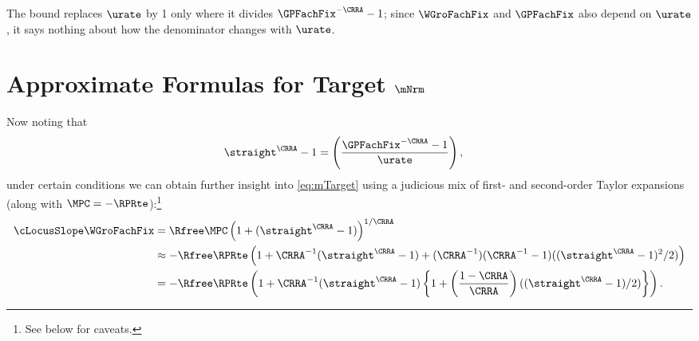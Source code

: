 \documentclass{econark}
\begin{document}
The bound replaces $\urate$ by 1 only where it divides $\GPFachFix^{-\CRRA}-1$; since $\WGroFachFix$ and $\GPFachFix$ also depend on $\urate$, it says nothing about how the denominator changes with $\urate$.


\section{Approximate Formulas for Target $\mNrm$}\label{sec:mTargApprox}

Now noting that
\begin{equation}\begin{gathered}\begin{aligned}
  \straight^{\CRRA}-1 & =  \left(\frac{\GPFachFix^{-\CRRA} - 1}{\urate}\right),
\end{aligned}\end{gathered}\end{equation}
under certain conditions we can obtain further insight into \eqref{eq:mTarget} using a judicious mix of first- and second-order Taylor expansions (along with $\MPC = -\RPRte$):\footnote{See below for caveats.}
\begin{equation}\begin{gathered}\begin{aligned}
  \label{eq:zetaExp}
  \cLocusSlope\WGroFachFix & =  \Rfree \MPC \left(1+(\straight^{\CRRA}-1)\right)^{1/\CRRA}
\\ & \approx  -\Rfree \RPRte \left(1+\CRRA^{-1}(\straight^{\CRRA}-1)+(\CRRA^{-1})(\CRRA^{-1}-1)((\straight^{\CRRA}-1)^{2}/2)\right)
\\ & =  -\Rfree \RPRte \left(1+\CRRA^{-1}(\straight^{\CRRA}-1)\left\{1+\left(\frac{1-\CRRA}{\CRRA}\right)((\straight^{\CRRA}-1)/2)\right\}\right) %
.
\end{aligned}\end{gathered}\end{equation}
\end{document}
